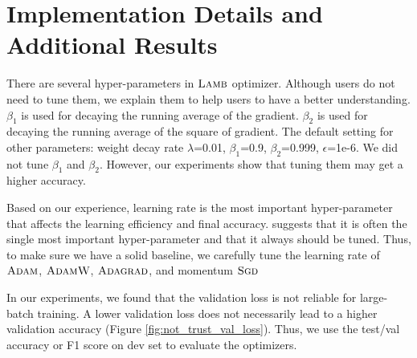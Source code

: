 \section{Implementation Details and Additional Results}

There are several hyper-parameters in $\textsc{Lamb}$ optimizer. 
Although users do not need to tune them, we explain them to help users to have a better understanding.
${\beta}_1$ is used for decaying the running average of the gradient.
${\beta}_2$ is used for decaying the running average of the square of gradient.
The default setting for other parameters: weight decay rate $\lambda$=0.01, ${\beta}_1$=0.9, ${\beta}_2$=0.999, $\epsilon$=1e-6.
We did not tune ${\beta}_1$ and ${\beta}_2$.
However, our experiments show that tuning them may get a higher accuracy.

Based on our experience, learning rate is the most important hyper-parameter that affects the learning efficiency and final accuracy.
\cite{bengio2012practical} suggests that it is often the single most important hyper-parameter and that it always should be tuned.
Thus, to make sure we have a solid baseline, we carefully tune the learning rate of $\textsc{Adam}$, $\textsc{AdamW}$, $\textsc{Adagrad}$, and momentum $\textsc{Sgd}$

In our experiments, we found that the validation loss is not reliable for large-batch training. A lower validation loss does not necessarily lead to a higher validation accuracy (Figure \ref{fig:not_trust_val_loss}).
Thus, we use the test/val accuracy or F1 score on dev set to evaluate the optimizers.



